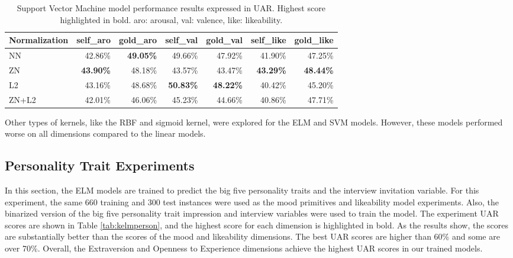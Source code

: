 \begin{table*}[h]
\begin{tabular}{|l|r|r|r|r|r|r|}
\hline
\rowcolor{Gray}
Normalization & \multicolumn{1}{l|}{self\_aro} & \multicolumn{1}{l|}{gold\_aro} & \multicolumn{1}{l|}{self\_val} & \multicolumn{1}{l|}{gold\_val} & \multicolumn{1}{l|}{self\_like} & \multicolumn{1}{l|}{gold\_like} \\ \hline
NN & 42.86\% & \textbf{49.05\%} & 49.66\% & 47.92\% & 41.90\% & 47.25\% \\ \hline
ZN & \textbf{43.90\%} & 48.18\% & 43.57\% & 43.47\% & \textbf{43.29\%} & \textbf{48.44\%} \\ \hline
L2 & 43.16\% & 48.68\% & \textbf{50.83\%} & \textbf{48.22\%} & 40.42\% & 45.20\% \\ \hline
ZN+L2 & 42.01\% & 46.06\% & 45.23\% & 44.66\% & 40.86\% & 47.71\% \\ \hline
\end{tabular}
\caption{Support Vector Machine model performance results expressed in UAR. Highest score highlighted in bold. aro: arousal, val: valence, like: likeability.}
\label{tab:svm}
\end{table*}

Other types of kernels, like the RBF and sigmoid kernel, were explored for the ELM and SVM models. However, these models performed worse on all dimensions compared to the linear models. 

\subsection{Personality Trait Experiments}\label{subsection:personexp}

In this section, the ELM models are trained to predict the big five personality traits and the interview invitation variable. For this experiment, the same 660 training and 300 test instances were used as the mood primitives and likeability model experiments. Also, the binarized version of the big five personality trait impression and interview variables were used to train the model. The experiment UAR scores are shown in Table \ref{tab:kelmperson}, and the highest score for each dimension is highlighted in bold. As the results show, the scores are substantially better than the scores of the mood and likeability dimensions. The best UAR scores are higher than 60\% and some are over 70\%. Overall, the Extraversion and Openness to Experience dimensions achieve the highest UAR scores in our trained models. 

